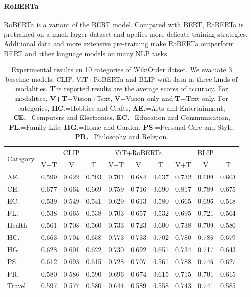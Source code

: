 \documentclass[11pt]{article}
\begin{document}
\paragraph*{RoBERTa}
RoBERTa is a variant of the BERT\citep{devlin2018bert} model. Compared with BERT, RoBERTa is pretrained on a much larger dataset and applies more delicate training strategies. Additional data and more extensive pre-training make RoBERTa outperform BERT and other language models on many NLP tasks.



\begin{table}[!tp]
\centering
\caption{Experimental results on 10 categories of WikiOrder datset. We evaluate 3 baseline models: CLIP, ViT+RoBERTa and BLIP with data in three kinds of modalities. The reported results are the average scores of accuracy. For modalities, \textbf{V+T}=Vision+Text, \textbf{V}=Vision-only and \textbf{T}=Text-only. For categories, \textbf{HC}.=Hobbies and Crafts, \textbf{AE.}=Arts and Entertainment, \textbf{CE.}=Computers and Electronics, \textbf{EC.}=Education and Communication, \textbf{FL.}=Family Life, \textbf{HG.}=Home and Garden, \textbf{PS.}=Personal Care and Style, \textbf{PR.}=Philosophy and Religion.}
\label{results}
\begin{tabular}{lccccccccc}
\hline
\multirow{2}{*}{Category} & \multicolumn{3}{c}{CLIP} & \multicolumn{3}{c}{ViT+RoBERTa} & \multicolumn{3}{c}{BLIP} \\ \cline{2-10} 
 & \multicolumn{1}{c}{V+T} & \multicolumn{1}{c}{V} & \multicolumn{1}{c}{T} & \multicolumn{1}{c}{V+T} & \multicolumn{1}{c}{V} & \multicolumn{1}{c}{T} & \multicolumn{1}{c}{V+T} & \multicolumn{1}{c}{V} & \multicolumn{1}{c}{T} \\ \hline
AE. & 0.599 & 0.622 & 0.593 & 0.701 & 0.684 & 0.637 & 0.732 & 0.699 & 0.603 \\
CE. & 0.677 & 0.664 & 0.669 & 0.759 & 0.716 & 0.690 & 0.817 & 0.789 & 0.675 \\
EC. & 0.539 & 0.549 & 0.541 & 0.629 & 0.613 & 0.580 & 0.665 & 0.696 & 0.518 \\
FL. & 0.538 & 0.665 & 0.538 & 0.703 & 0.657 & 0.532 & 0.695 & 0.721 & 0.564 \\
Health & 0.561 & 0.708 & 0.560 & 0.733 & 0.723 & 0.600 & 0.738 & 0.709 & 0.586 \\
HC. & 0.663 & 0.704 & 0.658 & 0.773 & 0.733 & 0.702 & 0.780 & 0.786 & 0.679 \\
HG. & 0.628 & 0.601 & 0.622 & 0.730 & 0.692 & 0.651 & 0.734 & 0.717 & 0.643 \\
PS. & 0.612 & 0.693 & 0.615 & 0.728 & 0.707 & 0.561 & 0.788 & 0.746 & 0.627 \\
PR. & 0.580 & 0.586 & 0.590 & 0.696 & 0.674 & 0.615 & 0.715 & 0.701 & 0.615 \\
Travel & 0.597 & 0.577 & 0.580 & 0.644 & 0.589 & 0.558 & 0.743 & 0.741 & 0.585 \\ \hline
\end{tabular}
\end{table}
\end{document}
